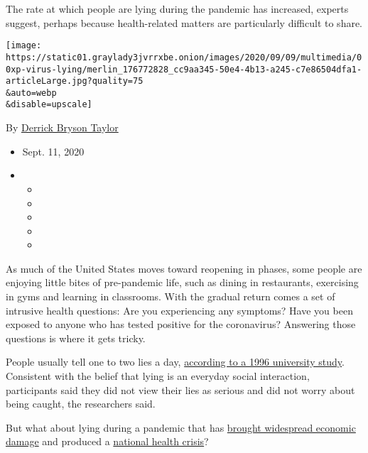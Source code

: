 The rate at which people are lying during the pandemic has increased,
experts suggest, perhaps because health-related matters are particularly
difficult to share.

\texttt{[image: https://static01.graylady3jvrrxbe.onion/images/2020/09/09/multimedia/00xp-virus-lying/merlin\_176772828\_cc9aa345-50e4-4b13-a245-c7e86504dfa1-articleLarge.jpg?quality=75\\\&auto=webp\\\&disable=upscale]}

By
\href{https://www.nytimes3xbfgragh.onion/by/derrick-bryson-taylor}{Derrick
Bryson Taylor}

\begin{itemize}
\item
  Sept. 11, 2020
\item
  \begin{itemize}
  \item
  \item
  \item
  \item
  \item
  \end{itemize}
\end{itemize}

As much of the United States moves toward reopening in phases, some
people are enjoying little bites of pre-pandemic life, such as dining in
restaurants, exercising in gyms and learning in classrooms. With the
gradual return comes a set of intrusive health questions: Are you
experiencing any symptoms? Have you been exposed to anyone who has
tested positive for the coronavirus? Answering those questions is where
it gets tricky.

People usually tell one to two lies a day,
\href{https://citeseerx.ist.psu.edu/viewdoc/download?doi=10.1.1.597.8906\&rep=rep1\&type=pdf}{according
to a 1996 university study}. Consistent with the belief that lying is an
everyday social interaction, participants said they did not view their
lies as serious and did not worry about being caught, the researchers
said.

But what about lying during a pandemic that has
\href{https://www.nytimes3xbfgragh.onion/2020/05/11/upshot/virus-lasting-economic-effects.html}{brought
widespread economic damage} and produced a
\href{https://www.nytimes3xbfgragh.onion/interactive/2020/08/12/us/covid-deaths-us.html}{national
health crisis}?

